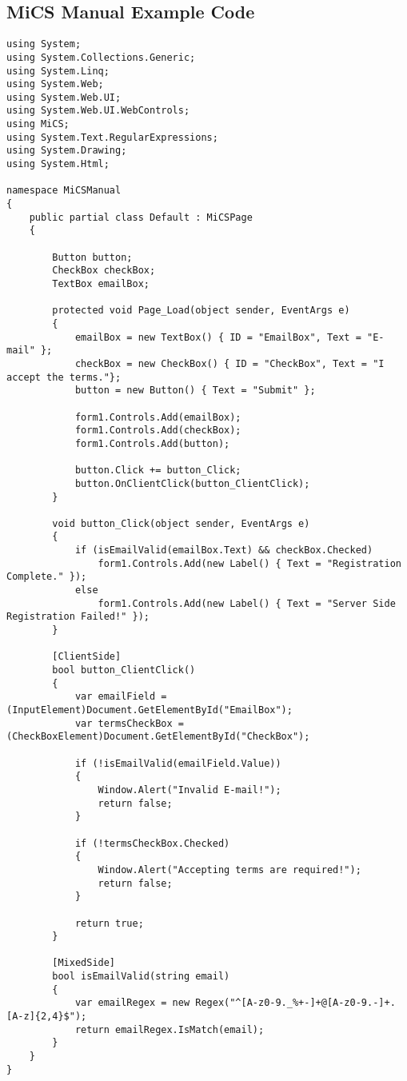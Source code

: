 \begin{appendices}
	\chapter{MiCS Manual Example Code}
	\label{AppendixA}

\begin{lstlisting}[language=CSharp,classoffset=1,morekeywords={Default, MiCSPage, Button, CheckBox, TextBox, EventArgs, Label, ClientSide, MixedSide, InputElement, CheckboxElement, Document, Window, Regex}]
using System;
using System.Collections.Generic;
using System.Linq;
using System.Web;
using System.Web.UI;
using System.Web.UI.WebControls;
using MiCS;
using System.Text.RegularExpressions;
using System.Drawing;
using System.Html;

namespace MiCSManual
{
    public partial class Default : MiCSPage
    {
        
        Button button;
        CheckBox checkBox;
        TextBox emailBox;

        protected void Page_Load(object sender, EventArgs e)
        {
            emailBox = new TextBox() { ID = "EmailBox", Text = "E-mail" };
            checkBox = new CheckBox() { ID = "CheckBox", Text = "I accept the terms."};
            button = new Button() { Text = "Submit" };

            form1.Controls.Add(emailBox);
            form1.Controls.Add(checkBox);
            form1.Controls.Add(button);

            button.Click += button_Click;
            button.OnClientClick(button_ClientClick);
        }

        void button_Click(object sender, EventArgs e)
        {
            if (isEmailValid(emailBox.Text) && checkBox.Checked)
                form1.Controls.Add(new Label() { Text = "Registration Complete." });
            else
                form1.Controls.Add(new Label() { Text = "Server Side Registration Failed!" });
        }

        [ClientSide]
        bool button_ClientClick()
        {
            var emailField = (InputElement)Document.GetElementById("EmailBox");
            var termsCheckBox = (CheckBoxElement)Document.GetElementById("CheckBox");

            if (!isEmailValid(emailField.Value))
            {
                Window.Alert("Invalid E-mail!");
                return false;
            }

            if (!termsCheckBox.Checked)
            {
                Window.Alert("Accepting terms are required!");
                return false;
            }

            return true;
        }

        [MixedSide]
        bool isEmailValid(string email)
        {
            var emailRegex = new Regex("^[A-z0-9._%+-]+@[A-z0-9.-]+.[A-z]{2,4}$");
            return emailRegex.IsMatch(email);
        }
    }
}
\end{lstlisting}


\end{appendices}